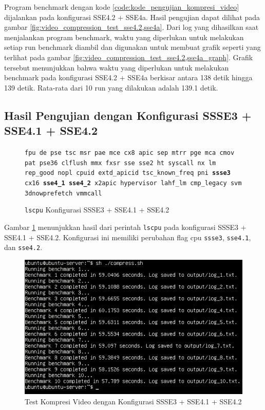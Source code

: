 Program benchmark dengan kode \ref{code:kode_pengujian_kompresi_video} dijalankan pada konfigurasi SSE4.2 + SSE4a. Hasil pengujian dapat dilihat pada gambar \ref{fig:video_compression_test_sse4.2,sse4a}. Dari log yang dihasilkan saat menjalankan program benchmark, waktu yang diperlukan untuk melakukan setiap run benchmark diambil dan digunakan untuk membuat grafik seperti yang terlihat pada gambar \ref{fig:video_compression_test_sse4.2,sse4a_graph}. Grafik tersebut menunjukkan bahwa waktu yang diperlukan untuk melakukan benchmark pada konfigurasi SSE4.2 + SSE4a berkisar antara 138 detik hingga 139 detik. Rata-rata dari 10 run yang dilakukan adalah 139.1 detik.

\subsection{Hasil Pengujian dengan Konfigurasi SSSE3 + SSE4.1 + SSE4.2}
\begin{figure}
    \texttt{fpu de pse tsc msr pae mce cx8 apic sep mtrr pge mca cmov pat pse36 clflush mmx fxsr sse sse2 ht syscall nx lm rep\_good nopl cpuid extd\_apicid tsc\_known\_freq pni \textbf{ssse3} cx16 \textbf{sse4\_1} \textbf{sse4\_2} x2apic hypervisor lahf\_lm cmp\_legacy svm 3dnowprefetch vmmcall}
    \caption{\texttt{lscpu} Konfigurasi SSSE3 + SSE4.1 + SSE4.2}
    \label{fig:lscpu_video_compression_test_ssse3,sse4.1,sse4.2}
\end{figure}

Gambar \ref{fig:lscpu_video_compression_test_ssse3,sse4.1,sse4.2} menunjukkan hasil dari perintah \texttt{lscpu} pada konfigurasi SSSE3 + SSE4.1 + SSE4.2. Konfigurasi ini memiliki perubahan flag cpu \texttt{ssse3}, \texttt{sse4.1}, dan \texttt{sse4.2}.

\begin{figure}
    \centering
    \includegraphics[width=1\textwidth]
    {assets/pics/video-compression-test/ssse3,sse4.1,sse4.2.jpeg}
    \caption{Test Kompresi Video dengan Konfigurasi SSSE3 + SSE4.1 + SSE4.2}
    \label{fig:video_compression_test_ssse3,sse4.1,sse4.2}
\end{figure}

